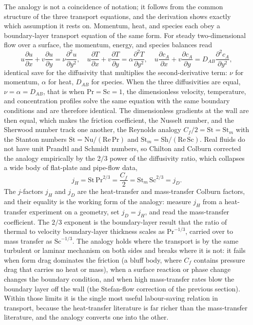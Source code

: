 The analogy is not a coincidence of notation; it follows from the
common structure of the three transport equations, and the derivation
shows exactly which assumption it rests on. Momentum, heat, and species
each obey a boundary-layer transport equation of the same form. For
steady two-dimensional flow over a surface, the momentum, energy, and
species balances read
\[
u\frac{\partial u}{\partial x} + v\frac{\partial u}{\partial y} =
\nu\frac{\partial^2 u}{\partial y^2},\quad
u\frac{\partial T}{\partial x} + v\frac{\partial T}{\partial y} =
\alpha\frac{\partial^2 T}{\partial y^2},\quad
u\frac{\partial c_A}{\partial x} + v\frac{\partial c_A}{\partial y} =
D_{AB}\frac{\partial^2 c_A}{\partial y^2},
\]
identical save for the diffusivity that multiplies the second-derivative
term: $\nu$ for momentum, $\alpha$ for heat, $D_{AB}$ for species. When
the three diffusivities are equal, $\nu = \alpha = D_{AB}$, that is when
$\mathrm{Pr} = \mathrm{Sc} = 1$, the dimensionless velocity, temperature,
and concentration profiles solve the same equation with the same boundary
conditions and are therefore identical. The dimensionless gradients at the
wall are then equal, which makes the friction coefficient, the Nusselt
number, and the Sherwood number track one another, the Reynolds analogy
$C_f/2 = \mathrm{St} = \mathrm{St}_m$ with the Stanton numbers
$\mathrm{St} = \mathrm{Nu}/(\mathrm{Re}\,\mathrm{Pr})$ and $\mathrm{St}_m
= \mathrm{Sh}/(\mathrm{Re}\,\mathrm{Sc})$. Real fluids do not have unit
Prandtl and Schmidt numbers, so Chilton and Colburn corrected the analogy
empirically by the $2/3$ power of the diffusivity ratio, which collapses a
wide body of flat-plate and pipe-flow data,
\[
j_H = \mathrm{St}\,\mathrm{Pr}^{2/3} = \frac{C_f}{2} =
\mathrm{St}_m\,\mathrm{Sc}^{2/3} = j_D.
\]
The $j$-factors $j_H$ and $j_D$ are the heat-transfer and mass-transfer
Colburn factors, and their equality is the working form of the analogy:
measure $j_H$ from a heat-transfer experiment on a geometry, set $j_D =
j_H$, and read the mass-transfer coefficient. The $2/3$ exponent is the
boundary-layer result that the ratio of thermal to velocity boundary-layer
thickness scales as $\mathrm{Pr}^{-1/3}$, carried over to mass transfer
as $\mathrm{Sc}^{-1/3}$. The analogy holds where the transport is by the
same turbulent or laminar mechanism on both sides and breaks where it is
not: it fails when form drag dominates the friction (a bluff body, where
$C_f$ contains pressure drag that carries no heat or mass), when a surface
reaction or phase change changes the boundary condition, and when high
mass-transfer rates blow the boundary layer off the wall (the Stefan-flow
correction of the previous section). Within those limits it is the single
most useful labour-saving relation in transport, because the heat-transfer
literature is far richer than the mass-transfer literature, and the
analogy converts one into the other.

